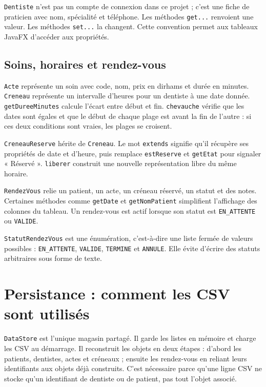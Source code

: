 \documentclass[11pt,a4paper]{report}
\begin{document}
\texttt{Dentiste} n'est pas un compte de connexion dans ce projet ; c'est une fiche de praticien avec nom, spécialité et téléphone. Les méthodes \texttt{get...} renvoient une valeur. Les méthodes \texttt{set...} la changent. Cette convention permet aux tableaux JavaFX d'accéder aux propriétés.

\section{Soins, horaires et rendez-vous}
\texttt{Acte} représente un soin avec code, nom, prix en dirhams et durée en minutes. \texttt{Creneau} représente un intervalle d'heures pour un dentiste à une date donnée. \texttt{getDureeMinutes} calcule l'écart entre début et fin. \texttt{chevauche} vérifie que les dates sont égales et que le début de chaque plage est avant la fin de l'autre : si ces deux conditions sont vraies, les plages se croisent.

\texttt{CreneauReserve} hérite de \texttt{Creneau}. Le mot \texttt{extends} signifie qu'il récupère ses propriétés de date et d'heure, puis remplace \texttt{estReserve} et \texttt{getEtat} pour signaler « Réservé ». \texttt{liberer} construit une nouvelle représentation libre du même horaire.

\texttt{RendezVous} relie un patient, un acte, un créneau réservé, un statut et des notes. Certaines méthodes comme \texttt{getDate} et \texttt{getNomPatient} simplifient l'affichage des colonnes du tableau. Un rendez-vous est actif lorsque son statut est \texttt{EN\_ATTENTE} ou \texttt{VALIDE}.

\texttt{StatutRendezVous} est une énumération, c'est-à-dire une liste fermée de valeurs possibles : \texttt{EN\_ATTENTE}, \texttt{VALIDE}, \texttt{TERMINE} et \texttt{ANNULE}. Elle évite d'écrire des statuts arbitraires sous forme de texte.

\chapter{Persistance : comment les CSV sont utilisés}
\texttt{DataStore} est l'unique magasin partagé. Il garde les listes en mémoire et charge les CSV au démarrage. Il reconstruit les objets en deux étapes : d'abord les patients, dentistes, actes et créneaux ; ensuite les rendez-vous en reliant leurs identifiants aux objets déjà construits. C'est nécessaire parce qu'une ligne CSV ne stocke qu'un identifiant de dentiste ou de patient, pas tout l'objet associé.
\end{document}
